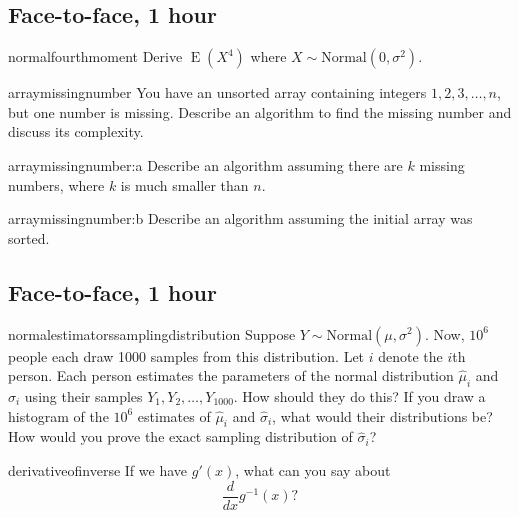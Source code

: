 \documentclass[a4paper]{article}
\begin{document}
\clearpage
\subsection{Face-to-face, 1 hour}
\begin{question}{normalfourthmoment}
Derive $\operatorname{E}(X^4)$ where $X \sim \text{Normal}\left(0, \sigma^2\right)$.
\end{question}


\begin{question}{arraymissingnumber}
You have an unsorted array containing integers $1,2,3, \ldots, n$, but one number is missing.
Describe an algorithm to find the missing number and discuss its complexity.
\end{question}


\begin{subquestion}{arraymissingnumber:a}
Describe an algorithm assuming there are $k$ missing numbers, where $k$ is much smaller than $n$.
\end{subquestion}


\begin{subquestion}{arraymissingnumber:b}
Describe an algorithm assuming the initial array was sorted.
\end{subquestion}


\clearpage






\clearpage
\subsection{Face-to-face, 1 hour}
\begin{question}{normalestimatorssamplingdistribution}
Suppose
$Y \sim \text{Normal}(\mu, \sigma^2)$.
Now, $10^6$ people each draw 1000 samples from this distribution.
Let $i$ denote the $i$th person.
Each person estimates the parameters of the normal distribution
$\hat{\mu}_i$
and
$\hat{\sigma}_i$
using their samples
$Y_1, Y_2, \ldots , Y_{1000}$.
How should they do this?
If you draw a histogram of the $10^6$ estimates of
$\hat{\mu}_i$ and $\hat{\sigma}_i$, what would their distributions be?
How would you prove the exact sampling distribution of $\hat{\sigma}_i$?
\end{question}


\begin{question}{derivativeofinverse}
If we have  $g'(x)$,
what can you say about
\[
\frac{d}{dx} g^{-1}(x)
\text{?}
\]
\end{question}
\end{document}
